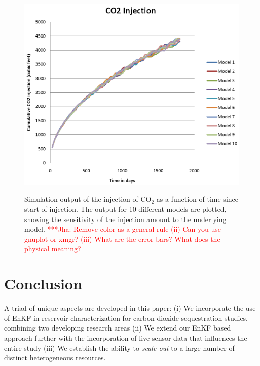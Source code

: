 \documentclass{acm_proc_article-sp}
\newcommand{\jhanote}[1]{ {\textcolor{red} { ***Jha: #1 }}}
\newcommand{\yyenote}[1]{ {\textcolor{blue} { ***yye00: #1 }}}
\newcommand{\jhanote}[1]{}
\newcommand{\yyenote}[1]{}
\begin{document}
\begin{figure}
\begin{center}\
\includegraphics[scale=0.33]{figures/co2seq.png}
\end{center}
\caption[Simulation Output]{Simulation output of the injection of
  CO$_2$ as a function of time since start of injection. The output
  for 10 different models are plotted, showing the sensitivity of the
  injection amount to the underlying model. \jhanote{Remove color as a
    general rule (ii) Can you use gnuplot or xmgr? (iii) What are the
    error bars? What does the physical meaning?}}
\label{fig:carbon}
\end{figure}



\section{Conclusion}
A triad of unique aspects are developed in this paper: (i) We
incorporate the use of EnKF in reservoir characterization for carbon
dioxide sequestration studies, combining two developing research areas
(ii) We extend our EnKF based approach further with the incorporation of
live sensor data that influences the entire study (iii) We establish
the ability to {\it scale-out} to a large number of distinct
heterogeneous resources.
\end{document}
